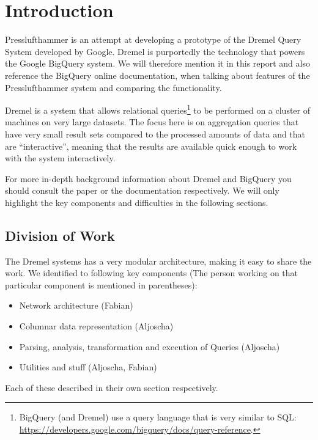 
\section{Introduction}
Presslufthammer is an attempt at developing a prototype of the Dremel Query
System \cite{melnik2010dremel} developed by Google. Dremel is purportedly the
technology that powers the Google BigQuery \cite{bigquery} system. We will
therefore mention it in this report and also reference the BigQuery online
documentation, when talking about features of the Presslufthammer system
and comparing the functionality.

Dremel is a system that allows relational queries\footnote{BigQuery
(and Dremel) use a query language that is very similar to SQL: 
\url{https://developers.google.com/bigquery/docs/query-reference}.} to be
performed on a cluster of machines on very large datasets. The focus here
is on aggregation queries that have very small result sets compared to the
processed amounts of data and that are ``interactive'', meaning that the
results are available quick enough to work with the system interactively.

For more in-depth background information about Dremel and BigQuery you should
consult the paper or the documentation respectively. We will only highlight
the key components and difficulties in the following sections.

\subsection{Division of Work}

The Dremel systems has a very modular architecture, making it easy to share the
work. We identified to following key components (The person working on that
particular component is mentioned in parentheses):

\begin{itemize}
  \item Network architecture (Fabian)
  \item Columnar data representation (Aljoscha)
  \item Parsing, analysis, transformation and execution of Queries (Aljoscha)
  \item Utilities and stuff (Aljoscha, Fabian)
\end{itemize}

Each of these described in their own section respectively.

